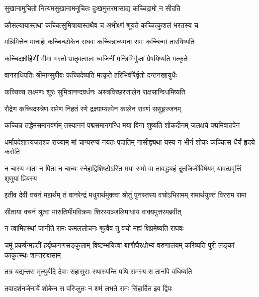 \twolineshloka
{सुखानामुचितो नित्यमसुखानामनूचितः}
{दुःखमुत्तरमासाद्य कच्चिद्रामो न सीदति} %

\twolineshloka
{कौसल्यायास्तथा कच्चित्सुमित्रायास्तथैव च}
{अभीक्ष्णं श्रूयते कच्चित्कुशलं भरतस्य च} %

\twolineshloka
{मन्निमित्तेन मानार्हः कच्चिच्छोकेन राघवः}
{कच्चिन्नान्यमना रामः कच्चिन्मां तारयिष्यति} %

\twolineshloka
{कच्चिदक्षौहिणीं भीमां भरतो भ्रातृवत्सलः}
{ध्वजिनीं मन्त्रिभिर्गुप्तां प्रेषयिष्यति मत्कृते} %

\twolineshloka
{वानराधिपतिः श्रीमान्सुग्रीवः कच्चिदेष्यति}
{मत्कृते हरिभिर्वीरैर्वृतो दन्तनखायुधैः} %

\twolineshloka
{कच्चिच्च लक्ष्मणः शूरः सुमित्रानन्दवर्धनः}
{अस्त्रविच्छरजालेन राक्षसान्विधमिष्यति} %

\twolineshloka
{रौद्रेण कच्चिदस्त्रेण रामेण निहतं रणे}
{द्रक्ष्याम्यल्पेन कालेन रावणं ससुहृज्जनम्} %

\fourlineindentedshloka
{कच्चिन्न तद्धेमसमानवर्णम्}
{तस्याननं पद्मसमानगन्धि}
{मया विना शुष्यति शोकदीनम्}
{जलक्षये पद्ममिवातपेन} %

\fourlineindentedshloka
{धर्मापदेशात्त्यजतश्च राज्याम्}
{मां चाप्यरण्यं नयतः पदातिम्}
{नासीद्व्यथा यस्य न भीर्न शोकः}
{कच्चित्स धैर्यं हृदये करोति} %

\fourlineindentedshloka
{न चास्य माता न पिता न चान्यः}
{स्नेहाद्विशिष्टोऽस्ति मया समो वा}
{तावद्ध्यहं दूतजिजीविषेयम्}
{यावत्प्रवृत्तिं शृणुयां प्रियस्य} %

\fourlineindentedshloka
{इतीव देवी वचनं महार्थम्}
{तं वानरेन्द्रं मधुरार्थमुक्त्वा}
{श्रोतुं पुनस्तस्य वचोऽभिरामम्}
{रामार्थयुक्तं विरराम रामा} %

\twolineshloka
{सीताया वचनं श्रुत्वा मारुतिर्भीमविक्रमः}
{शिरस्यञ्जलिमाधाय वाक्यमुत्तरमब्रवीत्} %

\twolineshloka
{न त्वामिहस्थां जानीते रामः कमललोचनः}
{श्रुत्वैव तु वचो मह्यं क्षिप्रमेष्यति राघवः} %

\threelineshloka
{चमूं प्रकर्षन्महतीं हर्यृष्कगणसङ्कुलाम्}
{विष्टम्भयित्वा बाणौघैरक्षोभ्यं वरुणालयम्}
{करिष्यति पुरीं लङ्कां काकुत्स्थः शान्तराक्षसाम्} %

\twolineshloka
{तत्र यद्यन्तरा मृत्युर्यदि देवाः सहासुराः}
{स्थास्यन्ति पथि रामस्य स तानपि वधिष्यति} %

\twolineshloka
{तवादर्शनजेनार्ये शोकेन स परिप्लुतः}
{न शर्म लभते रामः सिंहार्दित इव द्विपः} %


